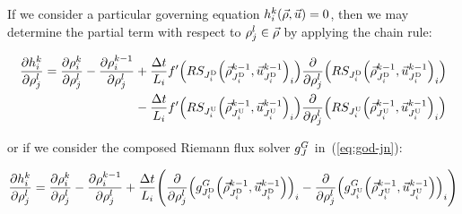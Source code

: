 If we consider a particular governing equation $\syseq_{\link}^{\tind}\left(\state,\control\right)=0$,
then we may determine the partial term with respect to $\rho_{j}^{l}\in\vec{\rho}$
by applying the chain rule:

\begin{align}
\pfrac{\syseq_{\link}^{\tind}}{\discrete jl}=\pfrac{\discrete{\link}{\tind}}{\discrete jl}-\pfrac{\discrete{\link}{\tind-1}}{\discrete jl} & +\frac{\Delta t}{L_{i}}f'\left(\RS_{\jdown{\link}}\left(\juncstate{\jdown{\link}}{\tind-1},\junccon{\jdown{\link}}{\tind-1}\right)_{\link}\right)\pfrac{}{\discrete jl}\left(\RS_{\jdown{\link}}\left(\juncstate{\jdown{\link}}{\tind-1},\junccon{\jdown{\link}}{\tind-1}\right)_{\link}\right)\label{eq:dhdufull}\\
 & -\frac{\Delta t}{L_{i}}f'\left(\RS_{\jup{\link}}\left(\juncstate{\jup{\link}}{\tind-1},\junccon{\jup{\link}}{\tind-1}\right)_{\link}\right)\pfrac{}{\discrete jl}\left(\RS_{\jup{\link}}\left(\juncstate{\jup{\link}}{\tind-1},\junccon{\jup{\link}}{\tind-1}\right)_{\link}\right)\nonumber 
\end{align}


or if we consider the composed Riemann flux solver $g^{G}_{J}$ in~(\ref{eq:god-jn}):

\begin{equation}
\pfrac{\syseq_{\link}^{\tind}}{\discrete jl}=\pfrac{\discrete{\link}{\tind}}{\discrete jl}-\pfrac{\discrete{\link}{\tind-1}}{\discrete jl}+\frac{\Delta t}{L_{i}}\left(\pfrac{}{\discrete jl}\left(\god_{\jdown{\link}}\left(\juncstate{\jdown{\link}}{\tind-1},\junccon{\jdown{\link}}{\tind-1}\right)\right)_{\link}-\pfrac{}{\discrete jl}\left(\god_{\jup{\link}}\left(\juncstate{\jup{\link}}{\tind-1},\junccon{\jup{\link}}{\tind-1}\right)\right)_{\link}\right)\label{eq:dhdugod}
\end{equation}


